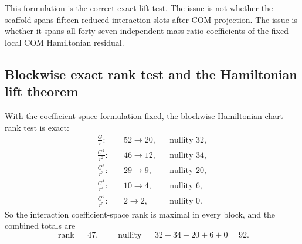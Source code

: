 \documentclass[11pt]{article}
\begin{document}
This formulation is the correct exact lift test.  The issue is not whether the
scaffold spans fifteen reduced interaction slots after COM projection.  The
issue is whether it spans all forty-seven independent mass-ratio coefficients of
the fixed local COM Hamiltonian residual.

\subsection{Blockwise exact rank test and the Hamiltonian lift theorem}
\label{app:hamiltonian-lift-rank-test}

With the coefficient-space formulation fixed, the blockwise Hamiltonian-chart
rank test is exact:
\begin{equation}
\begin{aligned}
\frac{G}{r}:&\quad 52\to 20, &&\text{nullity }32,\\
\frac{G^2}{r^2}:&\quad 46\to 12, &&\text{nullity }34,\\
\frac{G^3}{r^3}:&\quad 29\to 9, &&\text{nullity }20,\\
\frac{G^4}{r^4}:&\quad 10\to 4, &&\text{nullity }6,\\
\frac{G^5}{r^5}:&\quad 2\to 2, &&\text{nullity }0.
\end{aligned}
\label{eq:app-4pn-hamiltonian-lift-ranks}
\end{equation}
So the interaction coefficient-space rank is maximal in every block, and the
combined totals are
\begin{equation}
\operatorname{rank}=47,
\qquad
\operatorname{nullity}=32+34+20+6+0=92.
\label{eq:app-4pn-hamiltonian-lift-total-rank-nullity}
\end{equation}
\end{document}
